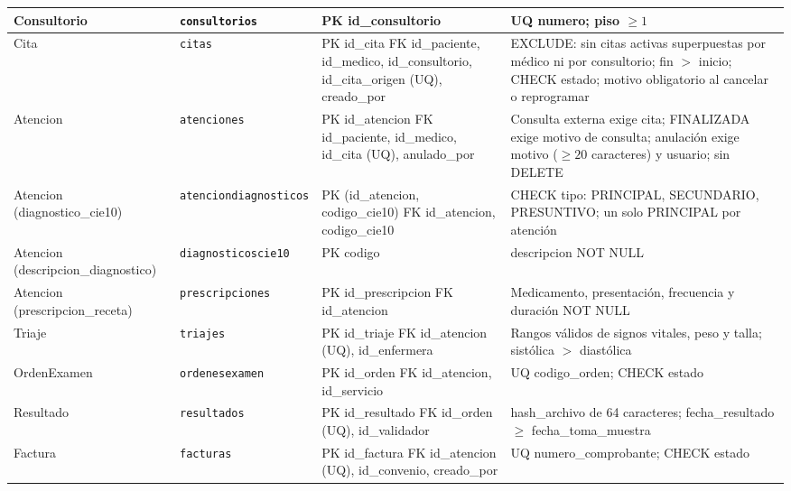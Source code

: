 \documentclass[11pt,a4paper]{article}
\newcommand{\tb}[1]{{\renewcommand{\_}{\textunderscore\allowbreak}\texttt{#1}}}
\begin{document}
\begin{xltabular}{\linewidth}{|P{3.1cm}|P{3.2cm}|P{4cm}|L|}
  Consultorio & \texttt{consultorios} &
    PK id\_consultorio &
    UQ numero; piso $\geq 1$ \\ \hline
  Cita & \texttt{citas} &
    PK id\_cita \newline FK id\_paciente, id\_medico, id\_consultorio, id\_cita\_origen (UQ), creado\_por &
    EXCLUDE: sin citas activas superpuestas por médico ni por consultorio; fin $>$ inicio; CHECK estado; motivo obligatorio al cancelar o reprogramar \\ \hline
  Atencion & \texttt{atenciones} &
    PK id\_atencion \newline FK id\_paciente, id\_medico, id\_cita (UQ), anulado\_por &
    Consulta externa exige cita; FINALIZADA exige motivo de consulta; anulación exige motivo ($\geq 20$ caracteres) y usuario; sin DELETE \\ \hline
  Atencion (diagnostico\_cie10) & \tb{atencion\_diagnosticos} &
    PK (id\_atencion, codigo\_cie10) \newline FK id\_atencion, codigo\_cie10 &
    CHECK tipo: PRINCIPAL, SECUNDARIO, PRESUNTIVO; un solo PRINCIPAL por atención \\ \hline
  Atencion (descripcion\_diagnostico) & \tb{diagnosticos\_cie10} &
    PK codigo &
    descripcion NOT NULL \\ \hline
  Atencion (prescripcion\_receta) & \texttt{prescripciones} &
    PK id\_prescripcion \newline FK id\_atencion &
    Medicamento, presentación, frecuencia y duración NOT NULL \\ \hline
  Triaje & \texttt{triajes} &
    PK id\_triaje \newline FK id\_atencion (UQ), id\_enfermera &
    Rangos válidos de signos vitales, peso y talla; sistólica $>$ diastólica \\ \hline
  OrdenExamen & \tb{ordenes\_examen} &
    PK id\_orden \newline FK id\_atencion, id\_servicio &
    UQ codigo\_orden; CHECK estado \\ \hline
  Resultado & \texttt{resultados} &
    PK id\_resultado \newline FK id\_orden (UQ), id\_validador &
    hash\_archivo de 64 caracteres; fecha\_resultado $\geq$ fecha\_toma\_muestra \\ \hline
  Factura & \texttt{facturas} &
    PK id\_factura \newline FK id\_atencion (UQ), id\_convenio, creado\_por &
    UQ numero\_comprobante; CHECK estado \\ \hline

\end{xltabular}
\end{document}
